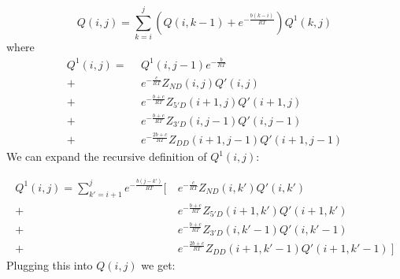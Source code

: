 \begin{equation}
Q(i,j) = \sum_{k=i}^j \left ( Q(i, k-1) + e^{-\frac{b(k-i)}{RT}}  \right )Q^1(k, j)
\end{equation}
where 
\begin{equation}
\begin{split}
Q^1(i, j) = \ \ & Q^1(i, j - 1) e^{-\frac{b}{RT}}  \\
 +\ & e^{-\frac{c}{RT} }Z_{ND}(i, j) Q'(i, j)  \\
+\ & e^{-\frac{b + c}{RT}}Z_{5'D}(i + 1, j)Q'(i + 1, j)  \\
+\ &  e^{-\frac{b + c}{RT}}Z_{3'D}(i, j-1)Q'(i, j - 1)  \\
+\ &  e^{-\frac{2b + c}{RT}}Z_{DD}(i + 1, j-1)Q'(i + 1, j-1) 
\end{split}
\end{equation}
\noindent
We can expand the recursive definition of $Q^1(i,j)$:

\begin{equation}
\begin{split}
Q^1(i, j) = \sum_{k' = i + 1}^j e^{-\frac{b(j - k')}{RT} } \bigg [ \ 
  & e^{-\frac{c}{RT} }Z_{ND}(i, k') Q'(i, k') \\
 +\ & e^{-\frac{b + c}{RT}}Z_{5'D}(i + 1, k')Q'(i + 1, k') \\ 
+\  & e^{-\frac{b + c}{RT}}Z_{3'D}(i, k'-1)Q'(i, k' - 1) \\
+\  & e^{-\frac{2b + c}{RT}}Z_{DD}(i + 1, k'-1)Q'(i + 1, k'-1) \   \bigg ]
\end{split}
\end{equation}
\noindent
Plugging this into $Q(i,j)$ we get:

